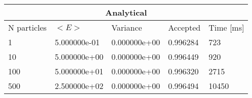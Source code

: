 \begin{tabular}{|l|l|l|l|l|}
\hline 
\multicolumn{5}{|c|}{Analytical}\\ 
\hline 
N particles & $<E>$ & Variance & Accepted & Time [ms]\\ 
 \hline 
1 & 5.000000e-01 & 0.000000e+00 & 0.996284 & 723 \\ 
\hline10 & 5.000000e+00 & 0.000000e+00 & 0.996449 & 920 \\ 
\hline100 & 5.000000e+01 & 0.000000e+00 & 0.996320 & 2715 \\ 
\hline500 & 2.500000e+02 & 0.000000e+00 & 0.996494 & 10450 \\ 
\hline\end{tabular}